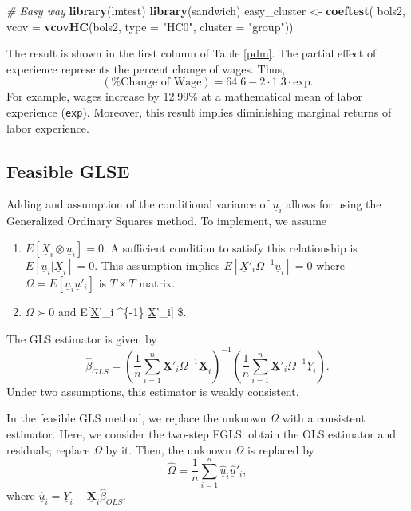 \documentclass[
  12pt,
]{article}
\newenvironment{Shaded}{\begin{snugshade}}{\end{snugshade}}
\newcommand{\CommentTok}[1]{\textcolor[rgb]{0.56,0.35,0.01}{\textit{#1}}}
\newcommand{\DataTypeTok}[1]{\textcolor[rgb]{0.13,0.29,0.53}{#1}}
\newcommand{\KeywordTok}[1]{\textcolor[rgb]{0.13,0.29,0.53}{\textbf{#1}}}
\newcommand{\NormalTok}[1]{#1}
\newcommand{\StringTok}[1]{\textcolor[rgb]{0.31,0.60,0.02}{#1}}
\providecommand{\tightlist}{%
  \setlength{\itemsep}{0pt}\setlength{\parskip}{0pt}}
\begin{document}
\begin{Shaded}
\begin{Highlighting}[]
\CommentTok{\# Easy way}
\KeywordTok{library}\NormalTok{(lmtest)}
\KeywordTok{library}\NormalTok{(sandwich)}
\NormalTok{easy\_cluster \textless{}{-}}\StringTok{ }\KeywordTok{coeftest}\NormalTok{(}
\NormalTok{  bols2, }\DataTypeTok{vcov =} \KeywordTok{vcovHC}\NormalTok{(bols2, }\DataTypeTok{type =} \StringTok{"HC0"}\NormalTok{, }\DataTypeTok{cluster =} \StringTok{"group"}\NormalTok{))}
\end{Highlighting}
\end{Shaded}

The result is shown in the first column of Table \ref{pdm}. The partial
effect of experience represents the percent change of wages. Thus, \[
  (\text{\% Change of Wage}) = 64.6 - 2 \cdot 1.3 \cdot \text{exp}.
\] For example, wages increase by 12.99\% at a mathematical mean of
labor experience (\texttt{exp}). Moreover, this result implies
diminishing marginal returns of labor experience.

\hypertarget{feasible-glse}{%
\subsection{Feasible GLSE}\label{feasible-glse}}

Adding and assumption of the conditional variance of \(\underline{u}_i\)
allows for using the Generalized Ordinary Squares method. To implement,
we assume

\begin{enumerate}
\def\labelenumi{\arabic{enumi}.}
\tightlist
\item
  \(E[\underline{X}_i \otimes \underline{u}_i] = 0\). A sufficient
  condition to satisfy this relationship is
  \(E[ \underline{u}_i | \underline{X}_i] = 0\). This assumption implies
  \(E[\underline{X}'_i \Omega^{-1} \underline{u}_i] = 0\) where
  \(\Omega = E[\underline{u}_i\underline{u}'_i]\) is \(T \times T\)
  matrix.
\item
  \(\Omega \succ 0\) and E{[}\underline{X}'\_i \Omega\^{}\{-1\}
  \underline{X}'\_i{]} \$.
\end{enumerate}

The GLS estimator is given by \[
  \hat{\beta}_{GLS} 
  = \left( \frac{1}{n} \sum_{i=1}^n \underline{\mathbf{X}}'_i \Omega^{-1} \underline{\mathbf{X}}_i \right)^{-1}
  \left( \frac{1}{n} \sum_{i=1}^n \underline{\mathbf{X}}'_i \Omega^{-1} \underline{Y}_i \right).
\] Under two assumptions, this estimator is weakly consistent.

In the feasible GLS method, we replace the unknown \(\Omega\) with a
consistent estimator. Here, we consider the two-step FGLS: obtain the
OLS estimator and residuals; replace \(\Omega\) by it. Then, the unknown
\(\Omega\) is replaced by \[
  \hat{\Omega} = \frac{1}{n} \sum_{i=1}^n \underline{\hat{u}}_i\underline{\hat{u}}'_i,
\] where
\(\underline{\hat{u}}_i = \underline{Y}_i - \underline{\mathbf{X}}_i \hat{\beta}_{OLS}\).
\end{document}
